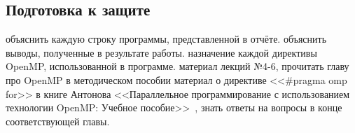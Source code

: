\subsection{Подготовка к защите}
\begin{enumerate}
     объяснить каждую строку программы, представленной в отчёте.
     объяснить выводы, полученные в результате работы.
     назначение каждой директивы OpenMP, использованной в программе.
     материал лекций №4-6, прочитать главу про OpenMP в методическом пособии
     материал о директиве <<\#pragma omp for>> в книге Антонова <<Параллельное программирование с использованием технологии OpenMP: Учебное пособие>>~\cite{AntonovOpenMP2004}, знать ответы на вопросы в конце соответствующей главы.
\end{enumerate}
